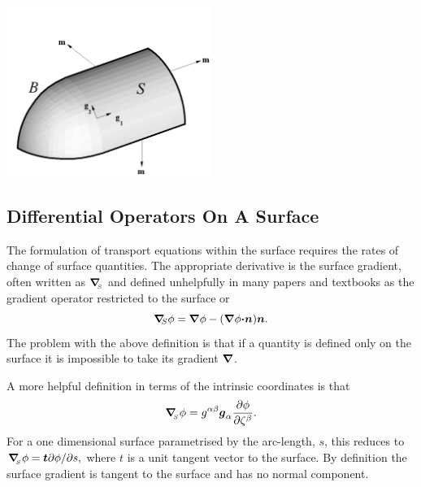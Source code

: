  
\begin{DoxyImage}
\includegraphics[width=0.5\textwidth]{surface_sketch}
\end{DoxyImage}




\hypertarget{index_surface_gradient}{}\subsection{Differential Operators On A Surface}\label{index_surface_gradient}
The formulation of transport equations within the surface requires the rates of change of surface quantities. The appropriate derivative is the surface gradient, often written as $ \mbox{\boldmath$\nabla$}_{\!\!_S} $ and defined unhelpfully in many papers and textbooks as the gradient operator restricted to the surface or \[ \mbox{\boldmath$\nabla$}_{\!\!S} \phi = \mbox{\boldmath$\nabla$} \phi - (\mbox{\boldmath$\nabla$}\phi \mbox{\boldmath$\cdot n$}) \mbox{\boldmath$n$}.\] The problem with the above definition is that if a quantity is defined only on the surface it is impossible to take its gradient $\mbox{\boldmath$\nabla$}$.

A more helpful definition in terms of the intrinsic coordinates is that \[ \mbox{\boldmath$\nabla$}_{\!\!_S} \phi = g^{\alpha\beta} \mbox{\boldmath$g$}_{\alpha} \frac{\partial \phi}{\partial \zeta^{\beta}}. \] For a one dimensional surface parametrised by the arc-\/length, $ s$, this reduces to $ \mbox{\boldmath$\nabla$}_{\!\!_S} \phi = \mbox{\boldmath$t$} \partial \phi / \partial s,$ where $ t$ is a unit tangent vector to the surface. By definition the surface gradient is tangent to the surface and has no normal component.

